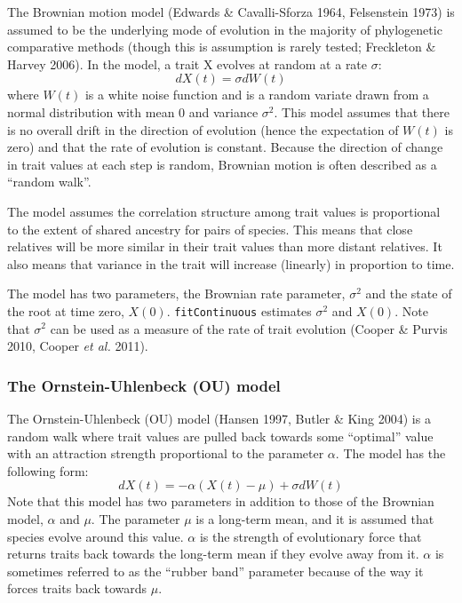\documentclass[11pt]{article}
\begin{document}
The Brownian motion model (Edwards \& Cavalli-Sforza 1964, Felsenstein 1973) is assumed to be the underlying mode of evolution in the majority of phylogenetic comparative methods (though this is assumption is rarely tested; Freckleton \& Harvey 2006). In the model, a trait X evolves at random at a rate $\sigma$:
\begin{equation}
dX(t) = \sigma dW(t)
\end{equation}
where $W(t)$ is a white noise function and is a random variate drawn from a normal distribution with mean $0$ and variance $\sigma^2$. This model assumes that there is no overall drift in the direction of evolution (hence the expectation of $W(t)$ is zero) and that the rate of evolution is constant. Because the direction of change in trait values at each step is random, Brownian motion is often described as a ``random walk''.


The model assumes the correlation structure among trait values is proportional to the extent of shared ancestry for pairs of species. This means that close relatives will be more similar in their trait values than more distant relatives. It also means that variance in the trait will increase (linearly) in proportion to time. 

The model has two parameters, the Brownian rate parameter, $\sigma^2$ and the state of the root at time zero, $X(0)$. \texttt{fitContinuous} estimates $\sigma^2$ and $X(0)$. Note that $\sigma^2$ can be used as a measure of the rate of trait evolution (Cooper \& Purvis 2010, Cooper \textit{et al.} 2011). 

\subsubsection{The Ornstein-Uhlenbeck (OU) model}
The Ornstein-Uhlenbeck (OU) model (Hansen 1997, Butler \& King 2004) is a random walk where trait values are pulled back towards some ``optimal'' value with an attraction strength proportional to the parameter $\alpha$. The model has the following form:
\begin{equation}
dX(t) = -\alpha(X(t) - \mu) + \sigma dW(t)
\end{equation}
Note that this model has two parameters in addition to those of the Brownian model, $\alpha$ and $\mu$. The parameter $\mu$ is a long-term mean, and it is assumed that species evolve around this value. $\alpha$ is the strength of evolutionary force that returns traits back towards the long-term mean if they evolve away from it. $\alpha$ is sometimes referred to as the ``rubber band'' parameter because of the way it forces traits back towards $\mu$.
\end{document}
